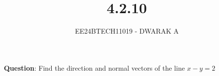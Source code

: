 \documentclass[journal]{IEEEtran}
\begin{document}

\vspace{3cm}

\title{4.2.10}
\author{EE24BTECH11019 - DWARAK A}
{\let\newpage\relax\maketitle}

\renewcommand{\thefigure}{\theenumi}
\renewcommand{\thetable}{\theenumi}
\setlength{\intextsep}{10pt} %


\renewcommand{\thetable}{\theenumi}


\textbf{Question}:
Find the direction and normal vectors of the line $x-y=2$
\end{document}
